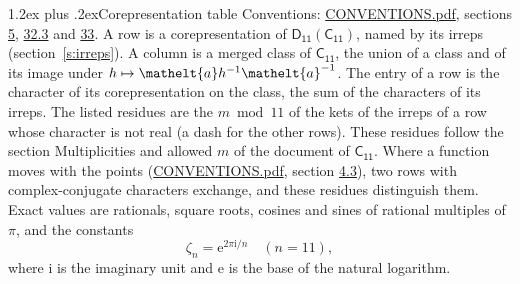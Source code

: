 \documentclass[10pt,a4paper]{article}
\makeatletter
\renewcommand\section{\@startsection{section}{1}{\z@}{-3ex plus -1ex minus -.2ex}%
  {1.2ex plus .2ex}{\normalfont\large\sffamily\bfseries\color{parttitle}}}
\numberwithin{equation}{section}
\newcommand{\eltfont}[1]{{\let\sigma\eltsigma\mathelt{#1}}}
\newcommand{\grp}[1]{\mathsf{#1}}
\newcommand{\elt}[1]{\eltfont{#1}}
\newcommand{\iunit}{\mathrm{i}}
\newcommand{\expe}{\mathrm{e}}
\newcommand{\rootunity}[1]{\zeta_{#1}}
\makeatother
\begin{document}
\section{Corepresentation table}\label{s:character_table}
Conventions: \href{../../CONVENTIONS.pdf}{CONVENTIONS.pdf}, sections \href{../../../rotation/CONVENTIONS.pdf\#conv.5}{5}, \href{../../CONVENTIONS.pdf\#conv.32.3}{32.3} and \href{../../CONVENTIONS.pdf\#conv.33}{33}.
A row is a corepresentation of $\grp{D_{11}}(\grp{C_{11}})$, named by its irreps (section~\ref{s:irreps}). A column is a merged class of $\grp{C_{11}}$, the union of a class and of its image under $h \mapsto \elt{a} h^{-1} \elt{a}^{-1}$. The entry of a row is the character of its corepresentation on the class, the sum of the characters of its irreps.
\leavevmode\label{n:head.parity}The listed residues are the $m \bmod 11$ of the kets of the irreps of a row whose character is not real (a dash for the other rows). These residues follow the section Multiplicities and allowed $m$ of the document of \href{../../../rotation/data/pdf/C11.pdf}{$\grp{C_{11}}$}. Where a function moves with the points (\href{../../CONVENTIONS.pdf}{CONVENTIONS.pdf}, section \href{../../../rotation/CONVENTIONS.pdf\#conv.4.3}{4.3}), two rows with complex-conjugate characters exchange, and these residues distinguish them.
\leavevmode\label{n:constant.root}\label{n:index.root.order}Exact values are rationals, square roots, cosines and sines of rational multiples of $\pi$, and the constants
\begin{equation}\label{e:constants}\rootunity{n} = \expe^{2\pi\iunit/n}\quad(n = 11),\end{equation}
where $\iunit$ is the imaginary unit and $\expe$ is the base of the natural logarithm.
\end{document}
